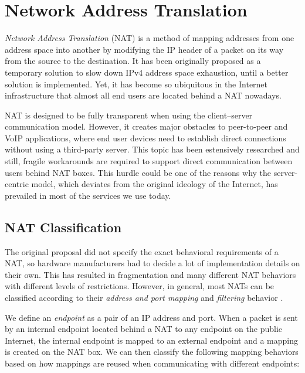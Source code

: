 \section{Network Address Translation}

\textit{Network Address Translation} (NAT) is a method of mapping addresses from one address space into another by modifying the IP header of a packet on its way from the source to the destination. It has been originally proposed as a temporary solution to slow down IPv4 address space exhaustion, until a better solution is implemented. \cite{nat} Yet, it has become so ubiquitous in the Internet infrastructure that almost all end users are located behind a NAT nowadays.

NAT is designed to be fully transparent when using the client–server communication model. However, it creates major obstacles to peer-to-peer and VoIP applications, where end user devices need to establish direct connections without using a third-party server. This topic has been estensively researched and still, fragile workarounds are required to support direct communication between users behind NAT boxes. This hurdle could be one of the reasons why the server-centric model, which deviates from the original ideology of the Internet, has prevailed in most of the services we use today.

\subsection{NAT Classification}
\label{nat-classification}


The original proposal did not specify the exact behavioral requirements of a NAT, so hardware manufacturers had to decide a lot of implementation details on their own. This has resulted in fragmentation and many different NAT behaviors with different levels of restrictions. However, in general, most NATs can be classified according to their \textit{address and port mapping} and \textit{filtering} behavior \cite{behave}.

We define an \textit{endpoint} as a pair of an IP address and port. When a packet is sent by an internal endpoint located behind a NAT to any endpoint on the public Internet, the internal endpoint is mapped to an external endpoint and a mapping is created on the NAT box. We can then classify the following mapping behaviors based on how mappings are reused when communicating with different endpoints:

